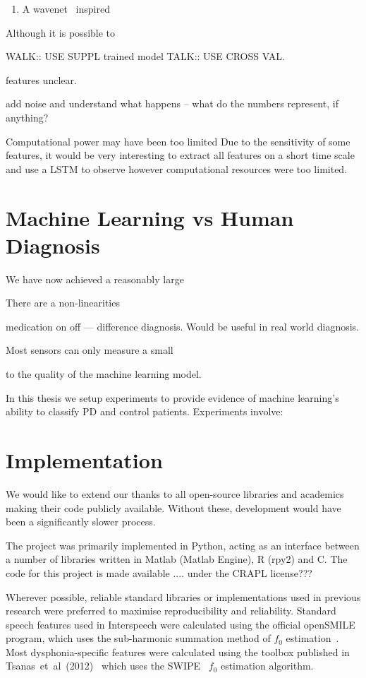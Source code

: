 \documentclass[12pt, twoside]{book}
\begin{document}
\begin{enumerate}[noitemsep, topsep=-10pt]
	\item A wavenet~\cite{wavenet} inspired 
\end{enumerate}

Although it is possible to 

WALK:: USE SUPPL trained model
TALK:: USE CROSS VAL.

features unclear.

add noise and understand what happens -- what do the numbers represent, if anything?



Computational power may have been too limited
Due to the sensitivity of some features, it would be very interesting to extract all features on a short time scale and use a LSTM to observe
however computational resources were too limited. 

\section{Machine Learning vs Human Diagnosis}
\label{powerml}
We have now achieved a reasonably large 


There are a non-linearities


medication on off --- difference diagnosis. Would be useful in real world diagnosis.

Most sensors can only measure a small 

to the quality of the machine learning model. 


In this thesis we setup experiments to provide evidence of machine learning's ability to classify PD and control patients. Experiments involve:

\section{Implementation}
\label{implementation}
We would like to extend our thanks to all open-source libraries and academics making their code publicly available. Without these, development would have been a significantly slower process. 

The project was primarily implemented in Python, acting as an interface between a number of libraries written in Matlab (Matlab Engine), R (rpy2) and C. The code for this project is made available .... under the CRAPL license???

Wherever possible, reliable standard libraries or implementations used in previous research were preferred to maximise reproducibility and reliability. Standard speech features used in Interspeech were calculated using the official openSMILE~\cite{opensmile} program, which uses the sub-harmonic summation method of $f_0$ estimation~\cite{shs}. Most dysphonia-specific features were calculated using the toolbox published in Tsanas~et~al~(2012)~\cite{spoverview} which uses the SWIPE~\cite{camacho2007swipe,f0estimation} $f_0$ estimation algorithm. 
\end{document}
